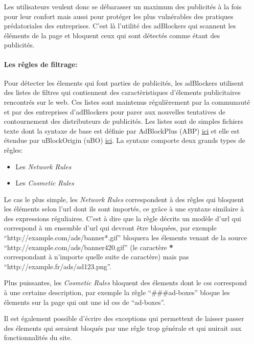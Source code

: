 \documentclass[oneside,a4paper,12pt]{article}
\begin{document}
Les utilisateurs veulent donc se débarasser un maximum des publicités à la fois pour leur confort mais aussi pour protéger les plus vulnérables des pratiques prédatoriales des entreprises. C'est là l'utilité des adBlockers qui scannent les éléments de la page et bloquent ceux qui sont détectés comme étant des publicités.

\paragraph*{Les rêgles de filtrage:}

Pour détecter les élements qui font parties de publicités, les adBlockers utilisent des listes de filtres qui contiennent des caractèristiques d'élements publicitaires rencontrés sur le web. Ces listes sont maintenus régulièrement par la communauté et par des entreprises d'adBlockers pour parer aux nouvelles tentatives de contournement des distributeurs de publicités. Les listes sont de simples fichiers texte dont la syntaxe de base est définie par AdBlockPlus (ABP) \href{https://help.eyeo.com/en/adblockplus/how-to-write-filters#allowlist}{ici} et elle est étendue par uBlockOrigin (uBO) \href{https://github.com/gorhill/uBlock/wiki/Static-filter-syntax#extended-syntax}{ici}. La syntaxe comporte deux grands types de rêgles: 
\begin{itemize}
\item Les \textit{Network Rules}
\item Les \textit{Cosmetic Rules}
\end{itemize}
Le cas le plus simple, les \textit{Network Rules} correspondent à des rêgles qui bloquent les éléments selon l'url dont ils sont importés, ce grâce à une syntaxe similaire à des expressions réguliaires. C'est à dire que la rêgle décrits un modèle d'url qui correspond à un ensemble d'url qui devront être bloquées, par exemple ``http://example.com/ads/banner*.gif'' bloquera les élements venant de la source ``http://example.com/ads/banner420.gif'' (le caractère \textbf{*}\\ correspondant à n'importe quelle suite de caractère) mais pas \\``http://example.fr/ads/ad123.png''.

Plus puissantes, les \textit{Cosmetic Rules} bloquent des élements dont le css correspond à une certaine description, par exemple la rêgle ``\#\#\#ad-boxes'' bloque les élements sur la page qui ont une id css de ``ad-boxes''.

Il est également possible d'écrire des exceptions qui permettent de laisser passer des élements qui seraient bloqués par une rêgle trop générale et qui nuirait aux fonctionnalités du site.
\end{document}
